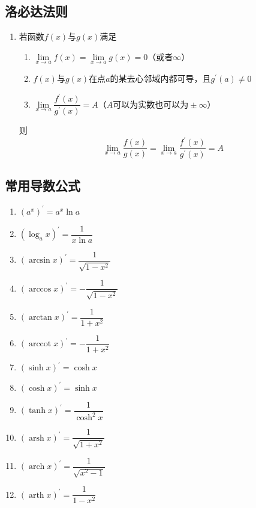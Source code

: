 \documentclass[12pt,a4paper,UTF8]{book}
\begin{document}
\subsection{洛必达法则}
\begin{enumerate}
\item 若函数$f\left(x\right)$与$g\left(x\right)$满足
\begin{enumerate}
\item $\lim\limits_{x\to a}f\left(x\right)=\lim\limits_{x\to a}g\left(x\right)=0\text{（或者}\infty\text{）}$
\item $f\left(x\right)$与$g\left(x\right)$在点$a$的某去心邻域内都可导，且$g^{\prime}\left(a\right)\neq0$
\item $\lim\limits_{x\to a}\dfrac{f^{\prime}\left(x\right)}{g^{\prime}\left(x\right)}=A\text{（}A\text{可以为实数也可以为}\pm\infty\text{）}$
\end{enumerate}
则
\[\lim\limits_{x\to a}\frac{f\left(x\right)}{g\left(x\right)}=\lim\limits_{x\to a}\frac{f^{\prime}\left(x\right)}{g^{\prime}\left(x\right)}=A\]
\end{enumerate}

\subsection{常用导数公式}
\begin{enumerate}
\item $\left(a^x\right)^\prime=a^x\ln a$
\item $\left(\log_ax\right)^\prime=\dfrac{1}{x\ln a}$
\item $\left(\arcsin x\right)^\prime=\dfrac{1}{\sqrt{1-x^2}}$
\item $\left(\arccos x\right)^\prime=-\dfrac{1}{\sqrt{1-x^2}}$
\item $\left(\arctan x\right)^\prime=\dfrac{1}{1+x^2}$
\item $\left(\operatorname{arccot}x\right)^\prime=-\dfrac{1}{1+x^2}$
\item $\left(\sinh x\right)^\prime=\cosh x$
\item $\left(\cosh x\right)^\prime=\sinh x$
\item $\left(\tanh x\right)^\prime=\dfrac{1}{\cosh^2x}$
\item $\left(\operatorname{arsh}x\right)^\prime=\dfrac{1}{\sqrt{1+x^2}}$
\item $\left(\operatorname{arch}x\right)^\prime=\dfrac{1}{\sqrt{x^2-1}}$
\item $\left(\operatorname{arth}x\right)^\prime=\dfrac{1}{1-x^2}$
\end{enumerate}
\end{document}

